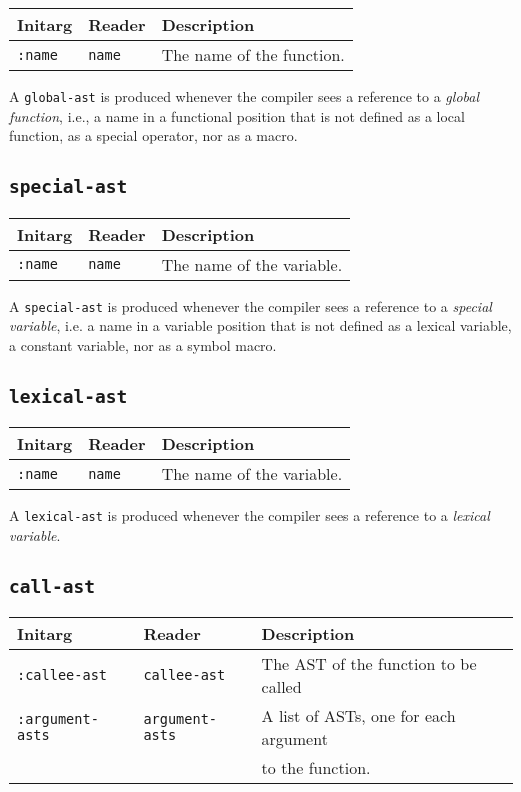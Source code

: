 \begin{tabular}{|l|l|l|}
\hline
Initarg & Reader & Description\\
\hline\hline
\texttt{:name} & \texttt{name} & The name of the function.\\  
\hline
\end{tabular}

A \texttt{global-ast} is produced whenever the compiler sees a
reference to a \emph{global function}, i.e., a name in a functional
position that is not defined as a local function, as a special
operator, nor as a macro.

\subsection{\texttt{special-ast}}
\label{special-ast}

\begin{tabular}{|l|l|l|}
\hline
Initarg & Reader & Description\\
\hline\hline
\texttt{:name} & \texttt{name} & The name of the variable.\\  
\hline
\end{tabular}

A \texttt{special-ast} is produced whenever the compiler sees a
reference to a \emph{special variable}, i.e. a name in a variable
position that is not defined as a lexical variable, a constant
variable, nor as a symbol macro.

\subsection{\texttt{lexical-ast}}
\label{lexical-ast}

\begin{tabular}{|l|l|l|}
\hline
Initarg & Reader & Description\\
\hline\hline
\texttt{:name} & \texttt{name} & The name of the variable.\\  
\hline
\end{tabular}

A \texttt{lexical-ast} is produced whenever the compiler sees a
reference to a \emph{lexical variable}. 

\subsection{\texttt{call-ast}}
\label{call-ast}

\begin{tabular}{|l|l|l|}
\hline
Initarg & Reader & Description\\
\hline\hline
\texttt{:callee-ast} & \texttt{callee-ast} & The AST of the function
to be called\\  
\hline
\texttt{:argument-asts} & \texttt{argument-asts} & A list of ASTs, one
for each argument\\
& & to the function.\\
\hline
\end{tabular}

